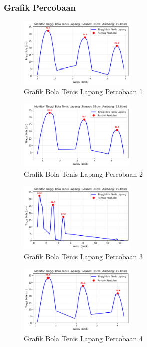 \subsubsection{Grafik Percobaan}
\begin{figure}[htbp]
    \centering
    \includegraphics[width=0.5\textwidth]{chapters/DataPercobaan/Grafik_Bola_Tenis_Lapang_1.png}
    \caption{Grafik Bola Tenis Lapang Percobaan 1}
\end{figure}
\begin{figure}[htbp]
    \centering
    \includegraphics[width=0.5\textwidth]{chapters/DataPercobaan/Grafik_Bola_Tenis_Lapang_2.png}
    \caption{Grafik Bola Tenis Lapang Percobaan 2}
\end{figure}
\begin{figure}[htbp]
    \centering
    \includegraphics[width=0.5\textwidth]{chapters/DataPercobaan/Grafik_Bola_Tenis_Lapang_3.png}
    \caption{Grafik Bola Tenis Lapang Percobaan 3}
\end{figure}
\begin{figure}[htbp]
    \centering
    \includegraphics[width=0.5\textwidth]{chapters/DataPercobaan/Grafik_Bola_Tenis_Lapang_4.png}
    \caption{Grafik Bola Tenis Lapang Percobaan 4}
\end{figure}
